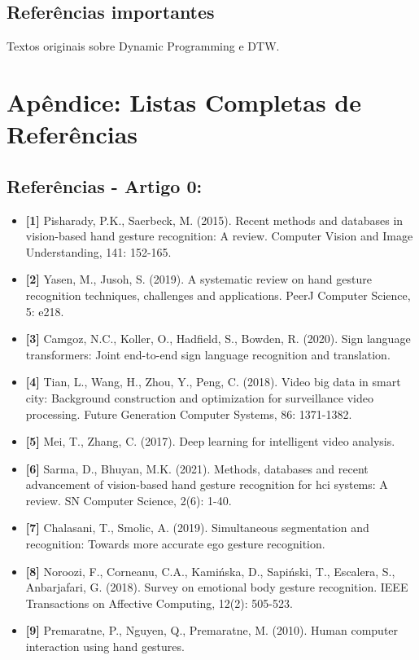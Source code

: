 \documentclass[12pt, a4paper]{article}
\begin{document}
\subsection{Referências importantes}
Textos originais sobre Dynamic Programming e DTW.
\newpage

\section{Apêndice: Listas Completas de Referências}
\subsection{Referências - Artigo 0:}
\begin{itemize}[label=]
    \item \textbf{[1]} Pisharady, P.K., Saerbeck, M. (2015). Recent methods and databases in vision-based hand gesture recognition: A review. Computer Vision and Image Understanding, 141: 152-165.
    \item \textbf{[2]} Yasen, M., Jusoh, S. (2019). A systematic review on hand gesture recognition techniques, challenges and applications. PeerJ Computer Science, 5: e218.
    \item \textbf{[3]} Camgoz, N.C., Koller, O., Hadfield, S., Bowden, R. (2020). Sign language transformers: Joint end-to-end sign language recognition and translation.
    \item \textbf{[4]} Tian, L., Wang, H., Zhou, Y., Peng, C. (2018). Video big data in smart city: Background construction and optimization for surveillance video processing. Future Generation Computer Systems, 86: 1371-1382.
    \item \textbf{[5]} Mei, T., Zhang, C. (2017). Deep learning for intelligent video analysis.
    \item \textbf{[6]} Sarma, D., Bhuyan, M.K. (2021). Methods, databases and recent advancement of vision-based hand gesture recognition for hci systems: A review. SN Computer Science, 2(6): 1-40.
    \item \textbf{[7]} Chalasani, T., Smolic, A. (2019). Simultaneous segmentation and recognition: Towards more accurate ego gesture recognition.
    \item \textbf{[8]} Noroozi, F., Corneanu, C.A., Kamińska, D., Sapiński, T., Escalera, S., Anbarjafari, G. (2018). Survey on emotional body gesture recognition. IEEE Transactions on Affective Computing, 12(2): 505-523.
    \item \textbf{[9]} Premaratne, P., Nguyen, Q., Premaratne, M. (2010). Human computer interaction using hand gestures.

\end{itemize}
\end{document}

